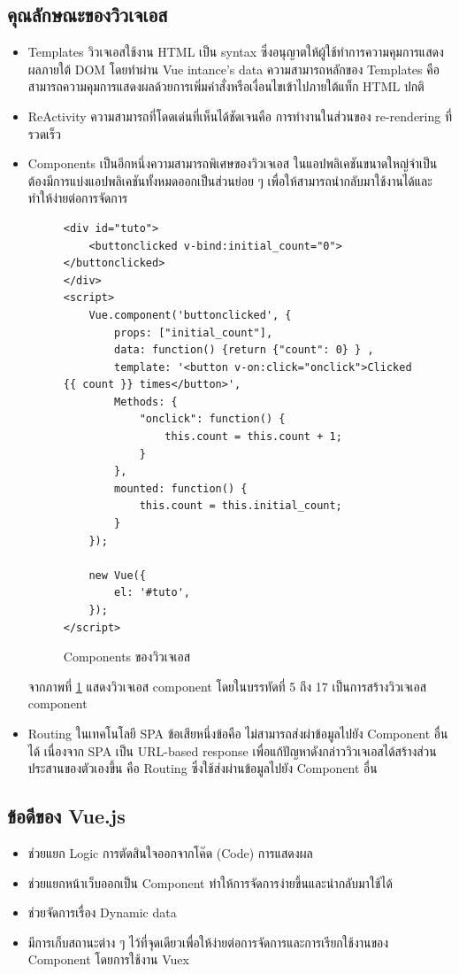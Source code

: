 		\subsection{คุณลักษณะของวิวเจเอส}
			\begin{itemize}
				\item Templates วิวเจเอสใช้งาน HTML เป็น syntax ซึ่งอนุญาตให้ผู้ใช้ทำการความคุมการแสดงผลภายใต้ DOM โดยทำผ่าน Vue intance's data ความสามารถหลักของ Templates คือ สามารถความคุมการแสดงผลด้วยการเพิ่มคำสั่งหรือเงื่อนไขเข้าไปภายใต้แท็ก HTML ปกติ
				\item ReActivity ความสามารถที่โดดเด่นที่เห็นได้ชัดเจนคือ การทำงานในส่วนของ re-rendering ที่รวดเร็ว
				\item Components เป็นอีกหนึ่งความสามารถพิเศษของวิวเจเอส ในแอปพลิเคชันขนาดใหญ่จำเป็นต้องมีการแบ่งแอปพลิเคชันทั้งหมดออกเป็นส่วนย่อย ๆ เพื่อให้สามารถนำกลับมาใช้งานได้และทำให้ง่ายต่อการจัดการ
						 	 		 			\begin{figure}[H]
						 	 		 				{\begin{lstlisting}
<div id="tuto">
	<buttonclicked v-bind:initial_count="0"></buttonclicked>
</div>
<script>
	Vue.component('buttonclicked', {
		props: ["initial_count"],
		data: function() {return {"count": 0} } ,
		template: '<button v-on:click="onclick">Clicked {{ count }} times</button>',
		Methods: {
			"onclick": function() {
				this.count = this.count + 1;
			}
		},
		mounted: function() {
			this.count = this.initial_count;
		}
	});
	
	new Vue({
		el: '#tuto',
	});
</script>
						 	 		 					\end{lstlisting}}
						 	 		 				\caption{Components ของวิวเจเอส}
						 	 		 				\label{Fig:Components}
						 	 		 			\end{figure}	
						 	 		 			จากภาพที่ \ref{Fig:Components} แสดงวิวเจเอส component โดยในบรรทัดที่ 5 ถึง 17 เป็นการสร้างวิวเจเอส component 
					\item Routing ในเทคโนโลยี SPA ข้อเสียหนึ่งข้อคือ ไม่สามารถส่งผ่าข้อมูลไปยัง Component อื่นได้ เนื่องจาก SPA เป็น URL-based response เพื่อแก้ปัญหาดังกล่าววิวเจเอสได้สร้างส่วนประสานของตัวเองขึ้น คือ Routing ซึ่งใช้ส่งผ่านข้อมูลไปยัง Component อื่น 
			\end{itemize}
		
		\subsection{ข้อดีของ Vue.js}
		\begin{itemize}
			\item ช่วยแยก Logic การตัดสินใจออกจากโค๊ด (Code) การแสดงผล
			\item ช่วยแยกหน้าเว็บออกเป็น Component ทำให้การจัดการง่ายขึ้นและนำกลับมาใช้ได้
			\item ช่วยจัดการเรื่อง Dynamic data 
			\item มีการเก็บสถานะต่าง ๆ ไว้ที่จุดเดียวเพื่อให้ง่ายต่อการจัดการและการเรียกใช้งานของ Component โดยการใช้งาน Vuex
		\end{itemize}
	

